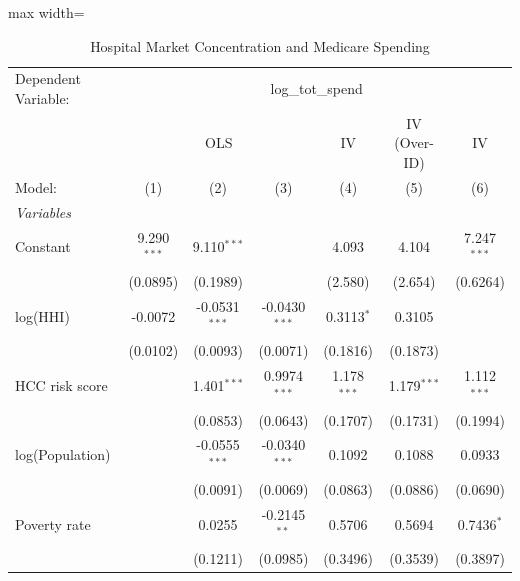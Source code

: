 
\begin{table}[htbp]
   \caption{\label{tab:main} Hospital Market Concentration and Medicare Spending}
   \centering
   \footnotesize
   \begin{adjustbox}{max width=\textwidth}
   \begin{tabular}{lcccccc}
      \tabularnewline \midrule \midrule
      Dependent Variable: & \multicolumn{6}{c}{log\_tot\_spend}\\
       & \multicolumn{3}{c}{OLS} & IV & IV (Over-ID) & IV \\ 
      Model:                          & (1)           & (2)             & (3)             & (4)           & (5)           & (6)\\  
      \midrule
      \emph{Variables}\\
      Constant                        & 9.290$^{***}$ & 9.110$^{***}$   &                 & 4.093         & 4.104         & 7.247$^{***}$\\   
                                      & (0.0895)      & (0.1989)        &                 & (2.580)       & (2.654)       & (0.6264)\\   
      log(HHI)                        & -0.0072       & -0.0531$^{***}$ & -0.0430$^{***}$ & 0.3113$^{*}$  & 0.3105        &   \\   
                                      & (0.0102)      & (0.0093)        & (0.0071)        & (0.1816)      & (0.1873)      &   \\   
      HCC risk score                  &               & 1.401$^{***}$   & 0.9974$^{***}$  & 1.178$^{***}$ & 1.179$^{***}$ & 1.112$^{***}$\\   
                                      &               & (0.0853)        & (0.0643)        & (0.1707)      & (0.1731)      & (0.1994)\\   
      log(Population)                 &               & -0.0555$^{***}$ & -0.0340$^{***}$ & 0.1092        & 0.1088        & 0.0933\\   
                                      &               & (0.0091)        & (0.0069)        & (0.0863)      & (0.0886)      & (0.0690)\\   
      Poverty rate                    &               & 0.0255          & -0.2145$^{**}$  & 0.5706        & 0.5694        & 0.7436$^{*}$\\   
                                      &               & (0.1211)        & (0.0985)        & (0.3496)      & (0.3539)      & (0.3897)\\   

\end{tabular}
\end{adjustbox}
\end{table}
